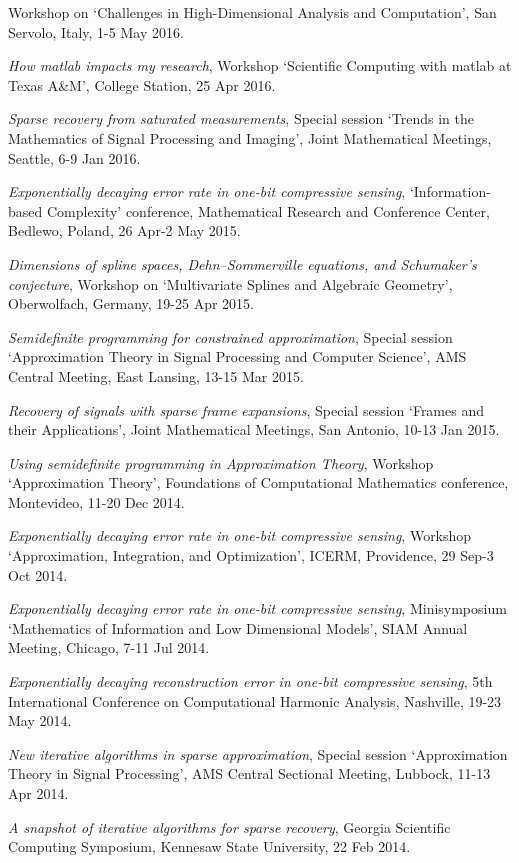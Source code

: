 \documentclass[11pt]{article}
\begin{document}
Workshop on `Challenges in High-Dimensional Analysis and Computation',
San Servolo, Italy, 1-5 May 2016.
\item {\sl How {\sc matlab} impacts my research},
Workshop `Scientific Computing with {\sc matlab} at Texas A\&M',
College Station, 25 Apr 2016. 
\item {\sl Sparse recovery from saturated measurements},
Special session `Trends in the Mathematics of Signal Processing and Imaging',
Joint Mathematical Meetings, Seattle, 6-9 Jan 2016.
\item {\sl Exponentially decaying error rate in one-bit compressive sensing}, `Information-based Complexity' conference, 
Mathematical Research and Conference Center, Bedlewo, Poland,
26 Apr-2 May 2015.
\item {\sl Dimensions of spline spaces, Dehn--Sommerville equations, and Schumaker’s conjecture},
Workshop on `Multivariate Splines and Algebraic Geometry', Oberwolfach, Germany, 19-25 Apr 2015.
\item {\sl Semidefinite programming for constrained approximation}, Special session `Approximation Theory in Signal Processing and Computer Science', AMS \mbox{Central} Meeting, East Lansing, 13-15 Mar 2015.
\item {\sl Recovery of signals with sparse frame expansions}, Special session `Frames and their Applications', Joint Mathematical Meetings, San Antonio, 10-13 Jan 2015. 
\item {\sl Using semidefinite programming in Approximation Theory}, Workshop `Approximation Theory',
Foundations of Computational Mathematics conference, Montevideo, 11-20 Dec 2014.
\item {\sl Exponentially decaying error rate in one-bit compressive sensing}, Workshop `Approximation, Integration, and Optimization',
ICERM, Providence, 29 Sep-3 Oct 2014. 
\item {\sl Exponentially decaying error rate in one-bit compressive sensing}, Minisymposium `Mathematics of Information and Low Dimensional Models',
SIAM Annual Meeting, Chicago, 7-11 Jul 2014.
\item {\sl Exponentially decaying reconstruction error in one-bit compressive sensing},  
5th International Conference on Computational Harmonic Analysis, Nashville, 19-23 May 2014.
\item {\sl New iterative algorithms in sparse approximation}, Special session `Approximation Theory in Signal Processing', AMS Central Sectional Meeting, Lubbock, 11-13 Apr 2014.
\item {\sl A snapshot of iterative algorithms for sparse recovery}, Georgia Scientific Computing Symposium, Kennesaw State University, 22 Feb 2014.
\end{document}
